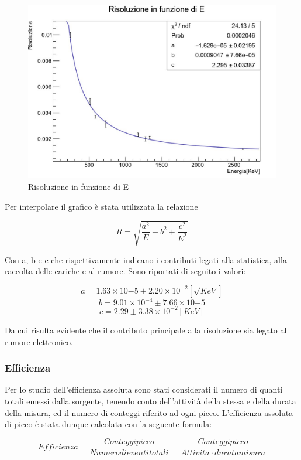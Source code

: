 \documentclass[a4paper,10pt]{article}
\begin{document}
\begin{figure}[H]
    \centering
    \includegraphics[scale=0.45]{grafici/risoluzionesources}
    \caption{Risoluzione in funzione di E}
\end{figure}

Per interpolare il grafico è stata utilizzata la relazione

\begin{equation}
	R=\sqrt{\frac{a^2}{E}+b^2+\frac{c^2}{E^2}}
\end{equation}

Con a, b e c che rispettivamente indicano i contributi legati alla statistica, alla raccolta delle cariche e al rumore. Sono riportati di seguito i valori:

$$
	a=1.63 \times 10{-5} \pm 2.20 \times 10^{-2} [\sqrt{KeV}]
$$
$$
	b=9.01 \times 10^{-4} \pm 7.66 \times 10{-5}
$$
$$
	c= 2.29 \pm 3.38 \times 10^{-2} [KeV]
$$

Da cui risulta evidente che il contributo principale alla risoluzione sia legato al rumore elettronico.

\subsubsection{Efficienza}
Per lo studio dell'efficienza assoluta sono stati considerati il numero di quanti totali emessi dalla sorgente, tenendo conto dell'attività della stessa e della durata della misura, ed il numero di conteggi riferito ad ogni picco. L'efficienza assoluta di picco è stata dunque calcolata con la seguente formula:

\begin{equation}
	Efficienza=\frac{Conteggi picco}{Numero di eventi totali}=\frac{Conteggi picco}{Attivita \cdot durata misura}
\end{equation}
\end{document}
